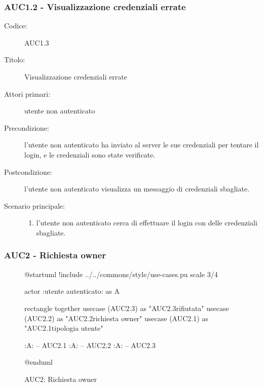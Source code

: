\documentclass[casi-duso]{subfiles}
\begin{document}
\subsubsection{AUC1.2 - Visualizzazione credenziali errate}%
\label{subsub:AUC1.3}
\begin{description}
  \item[Codice:] AUC1.3
  \item[Titolo:] Visualizzazione credenziali errate
  \item[Attori primari:] utente non autenticato
  \item[Precondizione:] l'utente non autenticato ha inviato al server le sue credenziali per tentare il login, e le credenziali sono state verificate.
  \item[Postcondizione:] l'utente non autenticato visualizza un messaggio di credenziali sbagliate.
  \item[Scenario principale:]
  \begin{enumerate}
    \item l'utente non autenticato cerca di effettuare il login con delle credenziali sbagliate.
  \end{enumerate}
\end{description}


\subsubsection{AUC2 - Richiesta owner}%
\label{subsub:AUC2}

\begin{figure}[h!]
  \centering
  \begin{plantuml}
  @startuml
  !include ../../commons/style/use-cases.pu
  scale 3/4

  actor :utente autenticato: as A

  rectangle {
    together {
      usecase (AUC2.3) as "AUC2.3\nRichiesta rifiutata"
      usecase (AUC2.2) as "AUC2.2\nInvio richiesta owner"
      usecase (AUC2.1) as "AUC2.1\nVerifica tipologia utente"
    }
  }

  :A: -- AUC2.1
  :A: -- AUC2.2
  :A: -- AUC2.3

  @enduml
  \end{plantuml}
  \caption{AUC2: Richiesta owner}
  \label{fig:auc2}
\end{figure}
\end{document}

